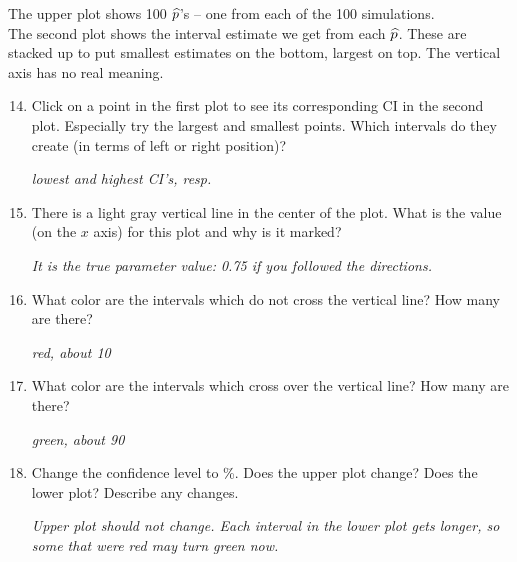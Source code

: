   The upper plot shows 100  $\widehat{p}$'s -- one from each of the 100 simulations.
  \\
  The second plot shows the interval estimate we get from each
  $\widehat{p}$.  These  are stacked up to put smallest estimates on the
  bottom, largest on top. The vertical axis has no real meaning. 

  \begin{enumerate}
    \setcounter{enumi}{13}
  \item   Click on a point in the first plot to see its corresponding CI in
  the second plot.  Especially try the largest and smallest points.
  Which intervals do they create (in terms of left or right position)?
\begin{students}
  \vspace{1cm}
\end{students}
\begin{key}
  {\it lowest and highest CI's, resp.}
\end{key}
\item There is a light gray vertical line in the center of the
  plot. What is the value (on the $x$ axis) for this plot and why is
  it marked?
\begin{students}
  \vspace{1cm}
\end{students}
\begin{key}
  {\it It is the true parameter value: 0.75 if you followed the directions.}
\end{key}
\item What color are the intervals which do not cross the vertical
  line? How many are there?
\begin{students}
  \vspace{1cm}
\end{students}

\begin{key}
  {\it red, about 10}
\end{key}

\item What color are the intervals which cross over the vertical
  line? How many are there?
\begin{students}
  \vspace{1cm}
\end{students}

\begin{key}
  {\it green, about 90}
\end{key}

\item Change the confidence level to \%. Does the upper plot
  change?  Does the lower plot?  Describe any changes.
\begin{students}
  \vspace{1cm}
\end{students}
\begin{key}
  {\it Upper plot should not change. Each interval in the lower plot
    gets longer, so some that were red may turn green now.}
\end{key}



\end{enumerate}
